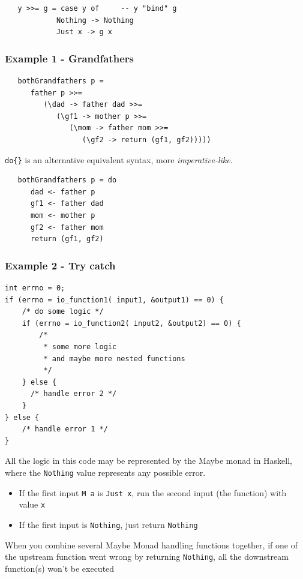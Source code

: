 \begin{lstlisting}
   y >>= g = case y of     -- y "bind" g
            Nothing -> Nothing
            Just x -> g x
\end{lstlisting}

\subsubsection{Example 1 - Grandfathers}
\begin{lstlisting}
   bothGrandfathers p =
      father p >>= 
         (\dad -> father dad >>= 
            (\gf1 -> mother p >>= 
               (\mom -> father mom >>= 
                  (\gf2 -> return (gf1, gf2)))))
\end{lstlisting}
   
\lstinline|do{}| is an alternative equivalent syntax, more \textit{imperative-like}.
\begin{lstlisting}
   bothGrandfathers p = do
      dad <- father p
      gf1 <- father dad
      mom <- mother p
      gf2 <- father mom
      return (gf1, gf2)
\end{lstlisting}

\subsubsection{Example 2 - Try catch}
\begin{lstlisting}
int errno = 0;
if (errno = io_function1( input1, &output1) == 0) {
    /* do some logic */
    if (errno = io_function2( input2, &output2) == 0) {
        /*
         * some more logic
         * and maybe more nested functions
         */
    } else {
      /* handle error 2 */
    }
} else {
    /* handle error 1 */
}

\end{lstlisting}

All the logic in this code may be represented by the Maybe monad in Haskell, where the \lstinline|Nothing| value represents any possible error.

\begin{itemize}
   \item If the first input \lstinline|M a| is \lstinline|Just x|, run the second input (the function) with value \lstinline|x|
   \item If the first input is \lstinline|Nothing|, just return \lstinline|Nothing|
\end{itemize}

When you combine several Maybe Monad handling functions together, if one of the upstream function went wrong by returning \lstinline|Nothing|, all the downstream function(s) won’t be executed

